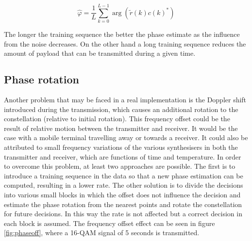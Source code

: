 \documentclass[12pt,a4paper,openright]{report}
\begin{document}
\begin{equation}
\hat \varphi  = \frac{1}{L}\sum\limits_{k=0}^{L - 1} {\arg (\tilde r(k)c(k)^*)}
\end{equation}

The longer the training sequence the better the phase estimate as the influence from the noise decreases. On the other hand a long training sequence reduces the amount of payload that can be transmitted during a given time.

\subsection{Phase rotation}
\label{subsec:Phase rotation}
Another problem that may be faced in a real implementation is the Doppler shift introduced during the transmission, which causes an additional rotation to the constellation (relative to initial rotation). This frequency offset could be the result of relative motion between the transmitter and receiver. It would be the case with a mobile terminal travelling away or towards a receiver. It could also be attributed to small frequency variations of the various synthesisers in both the transmitter and receiver, which are functions of time and temperature. In order to overcome this problem, at least two approaches are possible. The first is to introduce a training sequence in the data so that a new phase estimation can be computed, resulting in a lower rate. The other solution is to divide the decisions into various small blocks in which the offset does not influence the decision and estimate the phase rotation from the nearest points and rotate the constellation for future decisions. In this way the rate is not affected but a correct decision in each block is assumed. The frequency offset effect can be seen in figure \ref{fig:phaseoff}, where a 16-QAM signal of 5 seconds is transmitted. 
\end{document}

